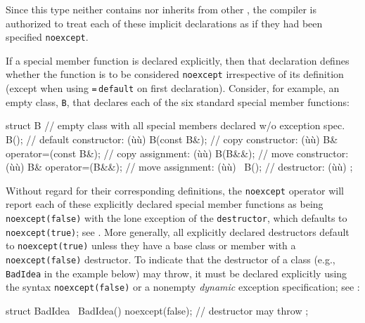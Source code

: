 \noindent Since this type neither contains nor inherits from other
, the compiler is authorized to treat
each of these implicit declarations as if they had been specified
\lstinline!noexcept!.

If a special member function is declared explicitly, then that
declaration defines whether the function is to be considered
\lstinline!noexcept! irrespective of its definition (except when using
\lstinline!=!\,\lstinline!default! on first declaration). Consider, for example, an empty
class, \lstinline!B!, that declares each of the six standard special member
functions:

\begin{emcppslisting}[emcppsbatch=e6]
struct B  // empty class with all special members declared w/o exception spec.
{
    B();                     // default constructor: (ù{}ù)
    B(const B&);             // copy constructor:    (ù{}ù)
    B& operator=(const B&);  // copy assignment:     (ù{}ù)
    B(B&&);                  // move constructor:    (ù{}ù)
    B& operator=(B&&);       // move assignment:     (ù{}ù)
    ~B();                    // destructor:          (ù{}ù)
};
\end{emcppslisting}
    

\noindent Without regard for their corresponding definitions, the
\lstinline!noexcept! operator will report each of these explicitly declared
special member functions as being \lstinline!noexcept(false)! with the lone
exception of the \lstinline!destructor!, which defaults to
\lstinline!noexcept(true)!; see . More generally, all explicitly declared
destructors default to \lstinline!noexcept(true)! unless they have a base
class or member with a \lstinline!noexcept(false)! destructor. To indicate
that the destructor of a class (e.g., \lstinline!BadIdea! in the example
below) may throw, it must be declared explicitly using the syntax
\lstinline!noexcept(false)! or a nonempty \emph{dynamic} exception
specification; see :

\begin{emcppslisting}[emcppsbatch=e6]
struct BadIdea
{
    ~BadIdea() noexcept(false);  // destructor may throw
};
\end{emcppslisting}
    

